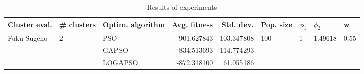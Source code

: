 \begin{table}
\centering
\caption{Results of experiments}
\begin{tabular}{lllrrllll}
\toprule
               Cluster eval. &        \# clusters & Optim. algorithm &  Avg. fitness &  Std. dev. &            Pop. size &         $\phi_{1}$ &               $\phi_{2}$ &                     w \\
\midrule
\multirow{3}{*}{Fuku Sugeno} & \multirow{3}{*}{2} &              PSO &   -901.627843 & 103.347808 & \multirow{3}{*}{100} & \multirow{3}{*}{1} & \multirow{3}{*}{1.49618} & \multirow{3}{*}{0.55} \\
                             &                    &            GAPSO &   -834.513693 & 114.774293 &                      &                    &                          &                       \\
                             &                    &          LOGAPSO &   -872.318100 &  61.055186 &                      &                    &                          &                       \\
\bottomrule
\end{tabular}
\end{table}
